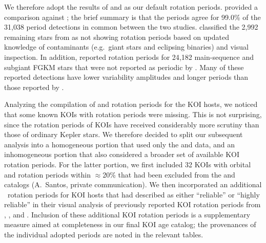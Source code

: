 \documentclass[11pt,twocolumn,tighten]{aastex63}
\begin{document}
We therefore adopt the results of  and
 as our default rotation periods.
 provided a comparison against
; the brief summary is that the periods
agree for 99.0\% of the 31{,}038 period detections in common between
the two studies.   classified the 2{,}992
remaining stars from  as not showing
rotation periods based on updated knowledge of contaminants
(e.g.~giant stars and eclipsing binaries) and visual inspection.  In
addition,  reported rotation periods for
24{,}182 main-sequence and subgiant FGKM stars that were not reported
as periodic by .  Many of these reported
detections have lower variability amplitudes and longer periods than
those reported by . 

Analyzing the compilation of  and
 rotation periods for the KOI hosts, we
noticed that some known KOIs with rotation periods were missing.  This
is not surprising, since the rotation periods of KOIs have received
considerably more scrutiny than those of ordinary Kepler stars.  We
therefore decided to split our subsequent analysis into a homogeneous
portion that used only the  and
 data, and an inhomogeneous portion that also
considered a broader set of available KOI rotation periods.  For the
latter portion, we first included 32 KOIs with orbital and rotation
periods within $\approx$20\% that had been
excluded %
from the  and 
catalogs (A.~Santos, private communication).  We then incorporated an
additional \nnewdavidtwentyone\ rotation periods for KOI hosts that
\citet{David_2021} had described as either ``reliable'' or ``highly
reliable'' in their visual analysis of previously reported KOI
rotation periods from \citet{McQuillan_2013}, \citet{Walkowicz_2013}, \citet{Mazeh_2015}
and \citet{Angus_2018}.  Inclusion of these additional KOI rotation
periods is a supplementary measure aimed at completeness in our final
KOI age catalog; the provenances of the individual adopted periods are
noted in the relevant tables.
\end{document}
